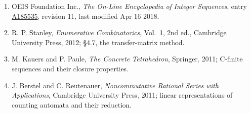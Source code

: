 \documentclass[11pt]{article}
\theoremstyle{definition}
\begin{document}
\begin{enumerate}

\item OEIS Foundation Inc., \emph{The On-Line Encyclopedia of Integer Sequences}, entry \href{https://oeis.org/A185535}{A185535}, revision 11, last modified Apr 16 2018.

\item R. P. Stanley, \emph{Enumerative Combinatorics}, Vol.~1, 2nd ed., Cambridge University Press, 2012; \S4.7, the transfer-matrix method.

\item M. Kauers and P. Paule, \emph{The Concrete Tetrahedron}, Springer, 2011; C-finite sequences and their closure properties.

\item J. Berstel and C. Reutenauer, \emph{Noncommutative Rational Series with Applications}, Cambridge University Press, 2011; linear representations of counting automata and their reduction.

\end{enumerate}
\end{document}
